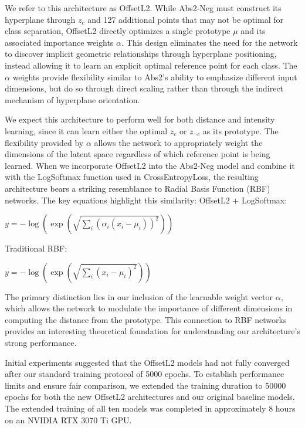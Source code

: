 We refer to this architecture as OffsetL2. While Abs2-Neg must construct its hyperplane through $z_c$ and 127 additional points that may not be optimal for class separation, OffsetL2 directly optimizes a single prototype $\mu$ and its associated importance weights $\alpha$. This design eliminates the need for the network to discover implicit geometric relationships through hyperplane positioning, instead allowing it to learn an explicit optimal reference point for each class. The $\alpha$ weights provide flexibility similar to Abs2's ability to emphasize different input dimensions, but do so through direct scaling rather than through the indirect mechanism of hyperplane orientation.

We expect this architecture to perform well for both distance and intensity learning, since it can learn either the optimal $z_c$ or $z_{\neg c}$ as its prototype. The flexibility provided by $\alpha$ allows the network to appropriately weight the dimensions of the latent space regardless of which reference point is being learned.
When we incorporate OffsetL2 into the Abs2-Neg model and combine it with the LogSoftmax function used in CrossEntropyLoss, the resulting architecture bears a striking resemblance to Radial Basis Function (RBF) networks. The key equations highlight this similarity:
OffsetL2 + LogSoftmax:

$y = -\log(\exp(\sqrt{\sum_i (\alpha_i(x_i - \mu_i))^2}))$

Traditional RBF:

$y = -\log(\exp(\sqrt{\sum_i (x_i - \mu_i)^2}))$

The primary distinction lies in our inclusion of the learnable weight vector $\alpha$, which allows the network to modulate the importance of different dimensions in computing the distance from the prototype. This connection to RBF networks provides an interesting theoretical foundation for understanding our architecture's strong performance.

Initial experiments suggested that the OffsetL2 models had not fully converged after our standard training protocol of 5000 epochs. To establish performance limits and ensure fair comparison, we extended the training duration to 50000 epochs for both the new OffsetL2 architectures and our original baseline models. The extended training of all ten models was completed in approximately 8 hours on an NVIDIA RTX 3070 Ti GPU.

